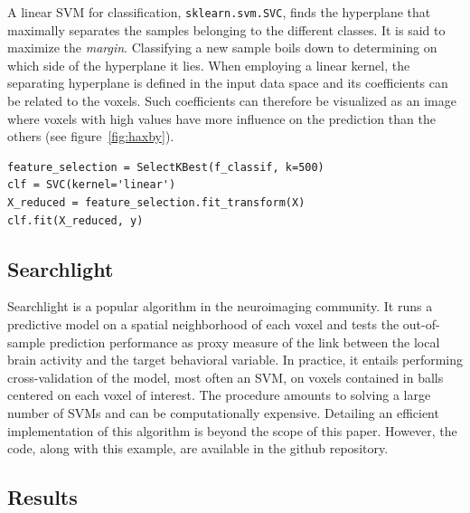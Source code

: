 \documentclass{frontiersSCNS} %
\begin{document}
A linear SVM for classification, \verb!sklearn.svm.SVC!,
finds the hyperplane that maximally
separates the samples belonging to the different classes.
It is said to maximize the \emph{margin}. Classifying a new sample boils
down to determining on which side of the hyperplane it lies. When employing a
linear kernel, the separating hyperplane is defined in the input
data space and its coefficients can be related to the voxels.
Such coefficients can therefore be visualized as an image
where voxels with high values have more influence on the prediction
than the others (see figure~\ref{fig:haxby}).

\begin{lstlisting}
feature_selection = SelectKBest(f_classif, k=500)
clf = SVC(kernel='linear')
X_reduced = feature_selection.fit_transform(X)
clf.fit(X_reduced, y)
\end{lstlisting}

\subsection{Searchlight}
\label{searchlight}

Searchlight \citep{kriegeskorte2006} is a popular algorithm in the
neuroimaging community. It runs a predictive model on a spatial
neighborhood of each voxel and tests the out-of-sample prediction
performance as proxy measure of the link between the local brain activity
and the target behavioral variable. In practice, it entails performing
cross-validation of the model, most often an SVM, on voxels contained in
balls centered on each voxel of interest. The procedure amounts to
solving a large number of SVMs and can be computationally expensive.
Detailing an efficient implementation of this algorithm is beyond the
scope of this paper. However, the code, along with this example,
are available in the github repository.

\subsection{Results}
\end{document}
